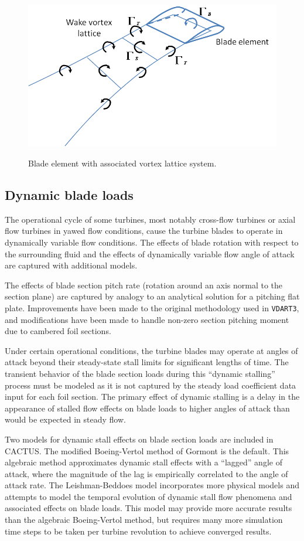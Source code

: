 \begin{figure}
\includegraphics{figures/vortex_lattice.png}
\label{fig:vortex_lattice}
\caption{Blade element with associated vortex lattice system.}
\end{figure}

\subsection{Dynamic blade loads}
The operational cycle of some turbines, most notably cross-flow turbines or axial flow turbines in yawed flow conditions, cause the turbine blades to operate in dynamically variable flow conditions. The effects of blade rotation with respect to the surrounding fluid and the effects of dynamically variable flow angle of attack are captured with additional models.

The effects of blade section pitch rate (rotation around an axis normal to the section plane) are captured by analogy to an analytical solution for a pitching flat plate. Improvements have been made to the original methodology used in \texttt{VDART3}, and modifications have been made to handle non-zero section pitching moment due to cambered foil sections.

Under certain operational conditions, the turbine blades may operate at angles of attack beyond their steady-state stall limits for significant lengths of time. The transient behavior of the blade section loads during this ``dynamic stalling'' process must be modeled as it is not captured by the steady load coefficient data input for each foil section. The primary effect of dynamic stalling is a delay in the appearance of stalled flow effects on blade loads to higher angles of attack than would be expected in steady flow.

Two models for dynamic stall effects on blade section loads are included in CACTUS. The modified Boeing-Vertol method of Gormont is the default. This algebraic method approximates dynamic stall effects with a ``lagged'' angle of attack, where the magnitude of the lag is empirically correlated to the angle of attack rate. The Leishman-Beddoes model incorporates more physical models and attempts to model the temporal evolution of dynamic stall flow phenomena and associated effects on blade loads. This model may provide more accurate results than the algebraic Boeing-Vertol method, but requires many more simulation time steps to be taken per turbine revolution to achieve converged results.

